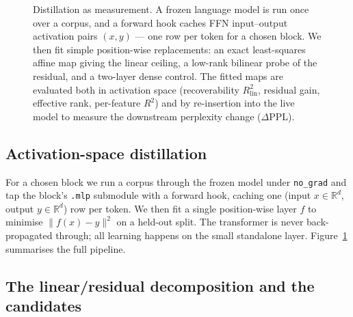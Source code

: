 \documentclass{article}
\newcommand{\Rlin}{R^2_{\mathrm{lin}}}
\begin{document}
\begin{figure}[t]
{\begin{tikzpicture}
  \end{tikzpicture}%
  }
  \caption{Distillation as measurement. A frozen language model is run once over a corpus, and a
  forward hook caches FFN input--output activation pairs $(x,y)$ --- one row per token for a
  chosen block. We then fit simple position-wise replacements: an exact least-squares affine map
  giving the linear ceiling, a low-rank bilinear probe of the residual, and a two-layer dense
  control. The fitted maps are evaluated both in activation space (recoverability $\Rlin$, residual
  gain, effective rank, per-feature $R^2$) and by re-insertion into the live model to measure the
  downstream perplexity change ($\Delta$PPL).}
  \label{fig:method}
\end{figure}

\subsection{Activation-space distillation}
\label{sec:distill}

For a chosen block we run a corpus through the frozen model under \texttt{no\_grad} and tap
the block's \texttt{.mlp} submodule with a forward hook, caching one (input
$x\in\mathbb{R}^d$, output $y\in\mathbb{R}^d$) row per token. We then fit a single
position-wise layer $f$ to minimise $\lVert f(x)-y\rVert^2$ on a held-out split. The
transformer is never back-propagated through; all learning happens on the small standalone
layer. Figure~\ref{fig:method} summarises the full pipeline.

\subsection{The linear/residual decomposition and the candidates}
\label{sec:candidates}
\end{document}
